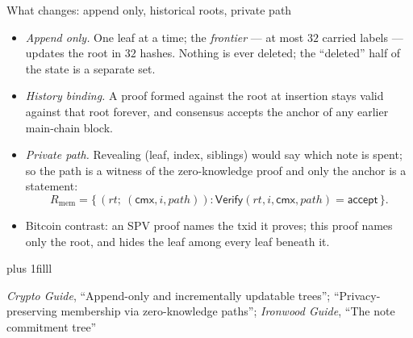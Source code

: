 \documentclass[aspectratio=169,11pt]{beamer}
\newcommand{\cmx}{\ensuremath{\mathsf{cmx}}}
\newcommand{\src}[1]{\par\vskip0pt plus 1filll
  {\fontsize{6}{7.2}\selectfont\color{arbdim}\raggedright #1\par}}
\begin{document}
\begin{frame}{What changes: append only, historical roots, private path}
\begin{itemize}
  \item \emph{Append only.} One leaf at a time; the \emph{frontier} --- at
    most $32$ carried labels --- updates the root in $32$ hashes. Nothing
    is ever deleted; the ``deleted'' half of the state is a separate set.
  \item \emph{History binding.} A proof formed against the root at
    insertion stays valid against that root forever, and consensus accepts
    the anchor of any earlier main-chain block.
  \item \emph{Private path.} Revealing (leaf, index, siblings) would say
    which note is spent; so the path is a witness of the zero-knowledge
    proof and only the anchor is a statement:
    \[
      R_{\mathrm{mem}} = \bigl\{\,(\mathit{rt};\ (\cmx, i, \mathit{path})) :
        \mathsf{Verify}(\mathit{rt}, i, \cmx, \mathit{path})
        = \mathsf{accept}\,\bigr\}.
    \]
  \item Bitcoin contrast: an SPV proof names the txid it proves; this proof
    names only the root, and hides the leaf among every leaf beneath it.
\end{itemize}
\src{\emph{Crypto Guide}, ``Append-only and incrementally updatable trees'';
  ``Privacy-preserving membership via zero-knowledge paths'';
  \emph{Ironwood Guide}, ``The note commitment tree''}
\end{frame}
\end{document}

